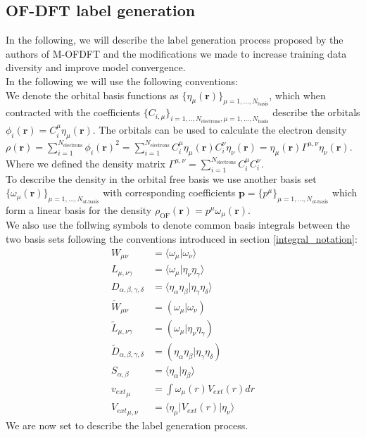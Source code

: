 \subsection{OF-DFT label generation}\label{ofdft_labelgen}
In the following, we will describe the label generation process proposed by the authors of M-OFDFT \cite{zhang_m-ofdft_2023} and the modifications we made to increase training data diversity and improve model convergence.\\
In the following we will use the following conventions:\\
We denote the orbital basis functions as $\{\eta_\mu(\mathbf{r})\}_{\mu=1,...,N_\text{basis}}$, which when contracted with the coefficients $\{C_{i,\mu}\}_{i=1,..,N_\text{electrons},\mu=1,...,N_\text{basis}}$ describe the orbitals $\phi_i(\mathbf{r}) = C_i^\mu \eta_\mu(\mathbf{r})$. The orbitals can be used to calculate the electron density $\rho(\mathbf{r}) = \sum_{i=1}^{N_\text{electrons}}\phi_i(\mathbf{r})^2=\sum_{i=1}^{N_\text{electrons}}C_i^\mu \eta_\mu(\mathbf{r})C_i^\nu \eta_\nu(\mathbf{r}) =  \eta_\mu(\mathbf{r})\Gamma^{\mu,\nu} \eta_\nu(\mathbf{r})$. Where we defined the density matrix $\Gamma^{\mu,\nu} = \sum_{i=1}^{N_\text{electrons}}C_i^\mu C_i^\nu$.\\
To describe the density in the orbital free basis we use another basis set $\{\omega_\mu(\mathbf{r})\}_{\mu=1,...,N_\text{of-basis}}$ with corresponding coefficients $\mathbf{p} =\{p^\mu\}_{\mu=1,...,N_\text{of-basis}}$ which form a linear basis for the density $\rho_\text{OF}(\mathbf{r}) = p^\mu \omega_\mu(\mathbf{r})$.\\
We also use the follwing symbols to denote common basis integrals between the two basis sets following the conventions introduced in section \ref{integral_notation}:
\begin{align}
    W_{\mu\nu} &= \langle\omega_\mu |\omega_\nu\rangle\\
    L_{\mu,\nu\gamma} &= \langle \omega_\mu |\eta_\nu\eta_\gamma\rangle\\
    D_{\alpha,\beta,\gamma,\delta}  &= \langle\eta_\alpha\eta_\beta|\eta_\gamma\eta_\delta\rangle\\
    \tilde{W}_{\mu\nu} &= (\omega_\mu |\omega_\nu)\\
    \tilde{L}_{\mu,\nu\gamma} &= (\omega_\mu |\eta_\nu\eta_\gamma)\\
    \tilde{D}_{\alpha,\beta,\gamma,\delta}  &= (\eta_\alpha\eta_\beta|\eta_\gamma\eta_\delta)\\
    S_{\alpha,\beta} &= \langle \eta_\alpha|\eta_\beta\rangle\\
    {v_{ext}}_\mu &= \int \omega_\mu (r) V_{ext} (r)dr\\
    {V_{ext}}_{\mu,\nu} &= \langle \eta_\mu | V_{ext} (r) | \eta_\nu \rangle
\end{align}
We are now set to describe the label generation process.\\
